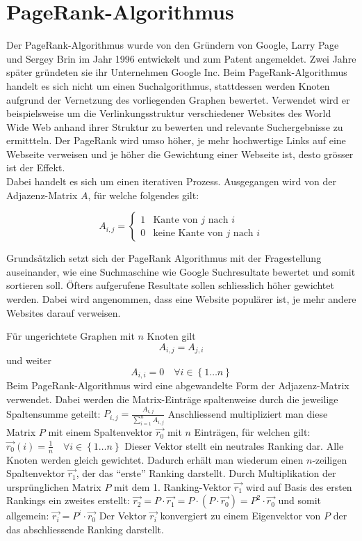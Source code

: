 \section{PageRank-Algorithmus}
Der PageRank-Algorithmus wurde von den Gründern von Google, Larry Page und Sergey Brin im Jahr 1996 entwickelt und zum Patent angemeldet. Zwei Jahre später gründeten sie ihr Unternehmen Google Inc.
Beim PageRank-Algorithmus handelt es sich nicht um einen Suchalgorithmus, stattdessen werden Knoten aufgrund der Vernetzung des vorliegenden Graphen bewertet.
Verwendet wird er beispielsweise um die Verlinkungsstruktur verschiedener Websites des World Wide Web anhand ihrer Struktur zu bewerten und relevante Suchergebnisse zu ermittteln. Der PageRank wird umso höher, je mehr hochwertige Links auf eine Webseite verweisen und je höher die Gewichtung einer Webseite ist, desto grösser ist der Effekt.\\
Dabei handelt es sich um einen iterativen Prozess. Ausgegangen wird von der Adjazenz-Matrix $A$, für welche folgendes gilt:

\begin{equation}
A_{i,j}=\left\{ \begin{matrix}
1 & \text{Kante von $j$ nach $i$} \\ 0 & \text{keine Kante von $j$ nach $i$}
\end{matrix}
 \right.
\label{verkehr:Adja}
\end{equation}

Grundsätzlich setzt sich der PageRank Algorithmus mit der Fragestellung auseinander, wie eine Suchmaschine wie Google Suchresultate bewertet und somit sortieren soll. Öfters aufgerufene Resultate sollen schliesslich höher gewichtet werden. Dabei wird angenommen, dass eine Website populärer ist, je mehr andere Websites darauf verweisen.



Für ungerichtete Graphen mit $n$ Knoten gilt \begin{equation}A_{i,j}=A_{j,i}\end{equation} und weiter \begin{equation}A_{i,i}=0\quad\forall i\in \left\{1\dots n\right\}\end{equation}
Beim PageRank-Algorithmus wird eine abgewandelte Form der Adjazenz-Matrix verwendet.
Dabei werden die Matrix-Einträge spaltenweise durch die jeweilige Spaltensumme geteilt:
\( P_{i,j}=\frac{A_{i,j}}{\sum_{i=1}^{n}A_{i,j}} \)
Anschliessend multipliziert man diese Matrix $P$ mit einem Spaltenvektor $\Vec{r_0}$ mit $n$ Einträgen, für welchen gilt:
\( \Vec{r_0}(i) = \frac{1}{n} \quad\forall i\in \left\{1\dots n\right\} \)
Dieser Vektor stellt ein neutrales Ranking dar. Alle Knoten werden gleich gewichtet.
Dadurch erhält man wiederum einen $n$-zeiligen Spaltenvektor $\Vec{r_1}$, der das ``erste'' Ranking darstellt. Durch Multiplikation der ursprünglichen Matrix $P$ mit dem 1. Ranking-Vektor $\Vec{r_1}$ wird auf Basis des ersten Rankings ein zweites erstellt:
\( \Vec{r_2} = P\cdot\Vec{r_1} = P\cdot(P\cdot\Vec{r_0}) = P^2\cdot\Vec{r_0}\)
und somit allgemein:
\( \Vec{r_i} = P^i\cdot\Vec{r_0}\)
Der Vektor $\Vec{r_i}$ konvergiert zu einem Eigenvektor von $P$ der das abschliessende Ranking darstellt.
